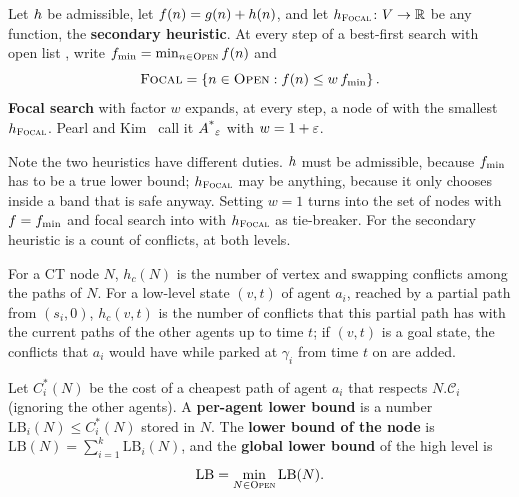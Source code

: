 \begin{definition}
\label{def:ch10-focal}
Let $h$ be admissible, let $f(n) = g(n) + h(n)$, and let
$h_{\textsc{Focal}} \colon V \to \mathbb{R}$ be any function, the \textbf{secondary
heuristic}. At
every step of a best-first search with open list \Open, write
$f_{\min} = \min_{n \in \textsc{Open}} f(n)$ and
\begin{equation}
  \textsc{Focal} = \left\{ n \in \textsc{Open} : f(n) \le w\,f_{\min} \right\}.
  \label{eq:ch10-focal}
\end{equation}
\textbf{Focal search} with factor $w$ expands, at
every step, a node of \Focal with the smallest $h_{\textsc{Focal}}$. Pearl and
Kim~\cite{pearl1982studies} call it $A\textsuperscript{*}_\varepsilon$ with $w = 1 + \varepsilon$.
\end{definition}

Note the two heuristics have different duties. $h$ must be admissible,
because $f_{\min}$ has to be a true lower bound; $h_{\textsc{Focal}}$ may be
anything, because it only chooses inside a band that is safe anyway. Setting
$w = 1$ turns \Focal into the set of nodes with $f = f_{\min}$ and
focal search into \astar with $h_{\textsc{Focal}}$ as tie-breaker. For \ecbs the
secondary heuristic is a count of conflicts, at both levels.

\begin{definition}
\label{def:ch10-hc}
For a CT node $N$, $h_c(N)$ is the number of
vertex and swapping conflicts among the paths of $N$. For a low-level state
$(v, t)$ of agent $a_i$, reached by a partial path from $(s_i, 0)$, $h_c(v, t)$
is the number of conflicts that this partial path has with the current paths
of the other agents up to time $t$; if $(v, t)$ is a goal state, the conflicts
that $a_i$ would have while parked at $\gamma_i$ from time $t$ on are added.
\end{definition}

\begin{definition}
\label{def:ch10-lb}
Let $C_i^*(N)$ be the cost of a cheapest path of agent $a_i$ that respects
$N.\mathcal{C}_i$ (ignoring the other agents). A \textbf{per-agent lower
bound} is a number $\mathrm{LB}_i(N) \le
C_i^*(N)$ stored in $N$. The \textbf{lower bound of the node} is $\mathrm{LB}(N) = \sum_{i=1}^{k} \mathrm{LB}_i(N)$,
and the \textbf{global lower bound} of the high
level is
\begin{equation}
  \mathrm{LB} = \min_{N \in \textsc{Open}} \mathrm{LB}(N).
  \label{eq:ch10-LB}
\end{equation}
\end{definition}

